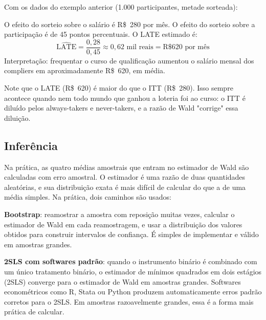 \begin{exemplobox}
Com os dados do exemplo anterior (1.000 participantes, metade sorteada):

\begin{center}
\end{center}

O efeito do sorteio sobre o salário é R\$~280 por mês. O efeito do sorteio sobre a participação é de 45 pontos percentuais. O LATE estimado é:
\[
\widehat{\text{LATE}} = \frac{0{,}28}{0{,}45} \approx 0{,}62 \text{ mil reais} = \text{R\$ 620 por mês}
\]
Interpretação: frequentar o curso de qualificação aumentou o salário mensal dos compliers em aproximadamente R\$~620, em média.

Note que o LATE (R\$~620) é maior do que o ITT (R\$~280). Isso sempre acontece quando nem todo mundo que ganhou a loteria foi ao curso: o ITT é diluído pelos always-takers e never-takers, e a razão de Wald "corrige" essa diluição.
\end{exemplobox}

\subsection*{Inferência}

Na prática, as quatro médias amostrais que entram no estimador de Wald são calculadas com erro amostral. O estimador é uma razão de duas quantidades aleatórias, e sua distribuição exata é mais difícil de calcular do que a de uma média simples. Na prática, dois caminhos são usados:

\textbf{Bootstrap}: reamostrar a amostra com reposição muitas vezes, calcular o estimador de Wald em cada reamostragem, e usar a distribuição dos valores obtidos para construir intervalos de confiança. É simples de implementar e válido em amostras grandes.

\textbf{2SLS com softwares padrão}: quando o instrumento binário é combinado com um único tratamento binário, o estimador de mínimos quadrados em dois estágios (2SLS) converge para o estimador de Wald em amostras grandes. Softwares econométricos como R, Stata ou Python produzem automaticamente erros padrão corretos para o 2SLS. Em amostras razoavelmente grandes, essa é a forma mais prática de calcular.

